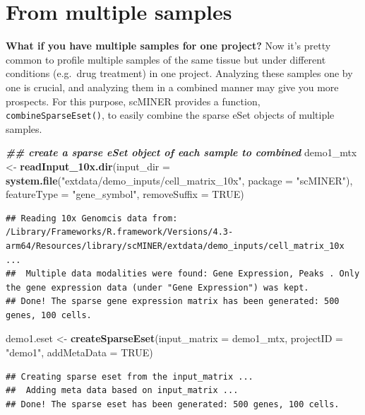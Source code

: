 \documentclass[
  12pt,
]{book}
\newenvironment{Shaded}{\begin{snugshade}}{\end{snugshade}}
\newcommand{\AttributeTok}[1]{\textcolor[rgb]{0.13,0.29,0.53}{#1}}
\newcommand{\ConstantTok}[1]{\textcolor[rgb]{0.56,0.35,0.01}{#1}}
\newcommand{\DocumentationTok}[1]{\textcolor[rgb]{0.56,0.35,0.01}{\textbf{\textit{#1}}}}
\newcommand{\FunctionTok}[1]{\textcolor[rgb]{0.13,0.29,0.53}{\textbf{#1}}}
\newcommand{\NormalTok}[1]{#1}
\newcommand{\OtherTok}[1]{\textcolor[rgb]{0.56,0.35,0.01}{#1}}
\newcommand{\StringTok}[1]{\textcolor[rgb]{0.31,0.60,0.02}{#1}}
\begin{document}
\section{From multiple samples}\label{from-multiple-samples}

\textbf{What if you have multiple samples for one project?} Now it's pretty common to profile multiple samples of the same tissue but under different conditions (e.g.~drug treatment) in one project. Analyzing these samples one by one is crucial, and analyzing them in a combined manner may give you more prospects. For this purpose, scMINER provides a function, \texttt{combineSparseEset()}, to easily combine the sparse eSet objects of multiple samples.

\begin{Shaded}
\begin{Highlighting}[]
\DocumentationTok{\#\# create a sparse eSet object of each sample to combined}
\NormalTok{demo1\_mtx }\OtherTok{\textless{}{-}} \FunctionTok{readInput\_10x.dir}\NormalTok{(}\AttributeTok{input\_dir =} \FunctionTok{system.file}\NormalTok{(}\StringTok{"extdata/demo\_inputs/cell\_matrix\_10x"}\NormalTok{, }\AttributeTok{package =} \StringTok{"scMINER"}\NormalTok{), }\AttributeTok{featureType =} \StringTok{"gene\_symbol"}\NormalTok{, }\AttributeTok{removeSuffix =} \ConstantTok{TRUE}\NormalTok{)}
\end{Highlighting}
\end{Shaded}

\begin{verbatim}
## Reading 10x Genomcis data from: /Library/Frameworks/R.framework/Versions/4.3-arm64/Resources/library/scMINER/extdata/demo_inputs/cell_matrix_10x ...
##  Multiple data modalities were found: Gene Expression, Peaks . Only the gene expression data (under "Gene Expression") was kept.
## Done! The sparse gene expression matrix has been generated: 500 genes, 100 cells.
\end{verbatim}

\begin{Shaded}
\begin{Highlighting}[]
\NormalTok{demo1.eset }\OtherTok{\textless{}{-}} \FunctionTok{createSparseEset}\NormalTok{(}\AttributeTok{input\_matrix =}\NormalTok{ demo1\_mtx, }\AttributeTok{projectID =} \StringTok{"demo1"}\NormalTok{, }\AttributeTok{addMetaData =} \ConstantTok{TRUE}\NormalTok{)}
\end{Highlighting}
\end{Shaded}

\begin{verbatim}
## Creating sparse eset from the input_matrix ...
##  Adding meta data based on input_matrix ...
## Done! The sparse eset has been generated: 500 genes, 100 cells.
\end{verbatim}
\end{document}
